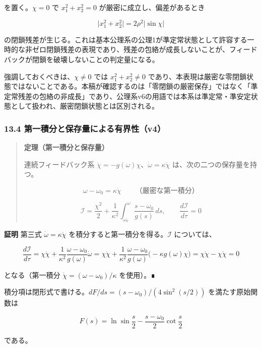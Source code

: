 \documentclass[
  a4paper,
]{ltjsarticle}
\begin{document}
を置く。\(\chi=0\) で \(x_1^2+x_2^2=0\) が厳密に成立し、偏差があるとき

\[
\lvert x_1^2+x_2^2\rvert=2\rho^2\lvert\sin\chi\rvert
\]

の閉鎖残差が生じる。これは基本公理系の公理1が準定常状態として許容する一時的な非ゼロ閉鎖残差の表現であり、残差の包絡が成長しないことが、フィードバックが閉鎖を破壊しないことの判定量になる。

強調しておくべきは、\(\chi\ne0\) では \(x_1^2+x_2^2\ne0\)
であり、本表現は厳密な零閉鎖状態ではないことである。本稿が確認するのは「零閉鎖の厳密保存」ではなく「準定常残差の包絡の非成長」であり、公理系v6の用語では本系は準定常・準安定状態として扱われ、厳密閉鎖状態とは区別される。

\subsubsection{13.4
第一積分と保存量による有界性（v4）}\label{ux7b2cux4e00ux7a4dux5206ux3068ux4fddux5b58ux91cfux306bux3088ux308bux6709ux754cux6027v4}

\begin{quote}
\textbf{定理（第一積分と保存量）}

連続フィードバック系
\(\ddot\chi=-g(\omega)\chi\)、\(\dot\omega=\kappa\ddot\chi\)
は、次の二つの保存量を持つ。

\[
\omega-\omega_0=\kappa\dot\chi
\qquad\text{（厳密な第一積分）}
\]

\[
\mathcal I
=
\frac{\chi^2}{2}
+
\frac{1}{\kappa^2}
\int_{\omega_0}^{\omega}
\frac{s-\omega_0}{g(s)}\,ds,
\qquad
\frac{d\mathcal I}{d\tau}=0
\]
\end{quote}

\textbf{証明} 第三式 \(\dot\omega=\kappa\ddot\chi\)
を積分すると第一積分を得る。\(\mathcal I\) については、

\[
\frac{d\mathcal I}{d\tau}
=\chi\dot\chi
+\frac{1}{\kappa^2}\frac{\omega-\omega_0}{g(\omega)}\dot\omega
=\chi\dot\chi
+\frac{1}{\kappa^2}\frac{\omega-\omega_0}{g(\omega)}\bigl(-\kappa g(\omega)\chi\bigr)
=\chi\dot\chi-\chi\dot\chi=0
\]

となる（第一積分 \(\dot\chi=(\omega-\omega_0)/\kappa\) を使用）。∎

積分項は閉形式で書ける。\(dF/ds=(s-\omega_0)/(4\sin^2(s/2))\)
を満たす原始関数は

\[
F(s)=\ln\sin\frac{s}{2}-\frac{s-\omega_0}{2}\cot\frac{s}{2}
\]

である。
\end{document}
